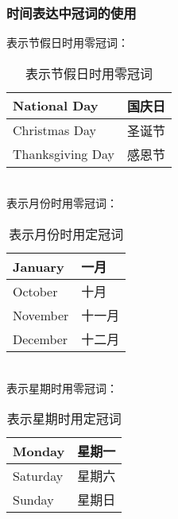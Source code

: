 \documentclass[UTF8]{ctexart}
\begin{document}
\subsubsection{时间表达中冠词的使用}
    表示节假日时用零冠词：
    \begin{table}[h!]
        \begin{center}
            \ttfamily
            \begin{tabular}{p{180pt}|p{100pt}}
                \hline
                National Day&国庆日\\ \hline
                Christmas Day&圣诞节\\ \hline
                Thanksgiving Day&感恩节\\ \hline
            \end{tabular}
            \rmfamily
            \caption{表示节假日时用零冠词}
        \end{center}
    \end{table}\\
    表示月份时用零冠词：
    \begin{table}[h!]
        \begin{center}
            \ttfamily
            \begin{tabular}{p{180pt}|p{100pt}}
                \hline
                January&一月\\ \hline
                October&十月\\ \hline
                November&十一月\\ \hline
                December&十二月\\ \hline
            \end{tabular}
            \rmfamily
            \caption{表示月份时用定冠词}
        \end{center}
    \end{table}\\
    表示星期时用零冠词：
    \begin{table}[h!]
        \begin{center}
            \ttfamily
            \begin{tabular}{p{180pt}|p{100pt}}
                \hline
                Monday&星期一\\ \hline
                Saturday&星期六\\ \hline
                Sunday&星期日\\ \hline
            \end{tabular}
            \rmfamily
            \caption{表示星期时用定冠词}
        \end{center}
    \end{table}\\
\end{document}
